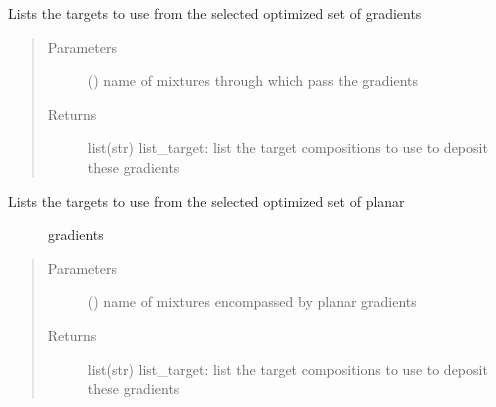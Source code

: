 \documentclass[letterpaper,10pt,english]{sphinxmanual}
\begin{document}
\begin{fulllineitems}
\label{\detokenize{ExperimentsPlannification:modules.listing_targets}}
\sphinxAtStartPar
Lists the targets to use from the selected optimized set of gradients
\begin{quote}\begin{description}
\item[{Parameters}] \leavevmode
\sphinxAtStartPar
{} () \textendash{} name of mixtures through which pass the gradients

\item[{Returns}] \leavevmode
\sphinxAtStartPar
list(str) list\_target: list the target compositions to use to deposit these gradients

\end{description}\end{quote}

\end{fulllineitems}

\label{\detokenize{ExperimentsPlannification:module-modules}}

\begin{fulllineitems}
\label{\detokenize{ExperimentsPlannification:modules.listing_targets_3cath}}\begin{description}
\item[{Lists the targets to use from the selected optimized set of planar}] \leavevmode
\sphinxAtStartPar
gradients

\end{description}
\begin{quote}\begin{description}
\item[{Parameters}] \leavevmode
\sphinxAtStartPar
{} () \textendash{} name of mixtures encompassed by planar gradients

\item[{Returns}] \leavevmode
\sphinxAtStartPar
list(str) list\_target: list the target compositions to use to deposit these gradients

\end{description}\end{quote}

\end{fulllineitems}
\end{document}
